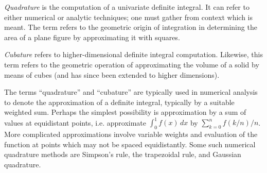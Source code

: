 \documentclass[12pt]{article}
\begin{document}
\emph{Quadrature} is the computation of a univariate definite integral.  It can refer to either numerical or analytic techniques; one must gather from context which is meant.  The term refers to the geometric origin of integration in determining the area of a plane figure by approximating it with squares.

\emph{Cubature} refers to higher-dimensional definite integral computation.  Likewise, this term refers to the geometric operation of approximating the volume of a solid by means of cubes (and has since been extended to higher dimensions).

The terms ``quadrature'' and ``cubature'' are typically used in numerical analysis
to denote the approximation of a definite integral, typically by a suitable
weighted sum.  Perhaps the simplest possibility is approximation by a sum of
values at equidistant points, i.e. approximate $\int_0^1 f(x) \, dx$ by
$\sum_{k=0}^n f(k/n) / n$.  More complicated approximations involve variable
weights and evaluation of the function at points which may not be spaced
equidistantly. Some such numerical quadrature methods are Simpson's rule, the trapezoidal rule, and Gaussian quadrature.
\end{document}
